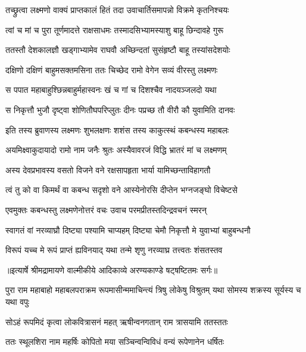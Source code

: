 \twolineshloka
{तच्छ्रुत्वा लक्ष्मणो वाक्यं प्राप्तकालं हितं तदा}
{उवाचार्तिसमापन्नो विक्रमे कृतनिश्चयः} %

\twolineshloka
{त्वां च मां च पुरा तूर्णमादत्ते राक्षसाधमः}
{तस्मादसिभ्यामस्याशु बाहू छिन्दावहे गुरू} %

\twolineshloka
{ततस्तौ देशकालज्ञौ खड्गाभ्यामेव राघवौ}
{अच्छिन्दतां सुसंहृष्टौ बाहू तस्यांसदेशयोः} %

\twolineshloka
{दक्षिणो दक्षिणं बाहुमसक्तमसिना ततः}
{चिच्छेद रामो वेगेन सव्यं वीरस्तु लक्ष्मणः} %

\twolineshloka
{स पपात महाबाहुश्छिन्नबाहुर्महास्वनः}
{खं च गां च दिशश्चैव नादयञ्जलदो यथा} %

\twolineshloka
{स निकृत्तौ भुजौ दृष्ट्वा शोणितौघपरिप्लुतः}
{दीनः पप्रच्छ तौ वीरौ कौ युवामिति दानवः} %

\twolineshloka
{इति तस्य ब्रुवाणस्य लक्ष्मणः शुभलक्षणः}
{शशंस तस्य काकुत्स्थं कबन्धस्य महाबलः} %

\twolineshloka
{अयमिक्ष्वाकुदायादो रामो नाम जनैः श्रुतः}
{अस्यैवावरजं विद्धि भ्रातरं मां च लक्ष्मणम्} %

\twolineshloka
{अस्य देवप्रभावस्य वसतो विजने वने}
{रक्षसापहृता भार्या यामिच्छन्ताविहागतौ} %

\twolineshloka
{त्वं तु को वा किमर्थं वा कबन्ध सदृशो वने}
{आस्येनोरसि दीप्तेन भग्नजङ्घो विचेष्टसे} %

\twolineshloka
{एवमुक्तः कबन्धस्तु लक्ष्मणेनोत्तरं वचः}
{उवाच परमप्रीतस्तदिन्द्रवचनं स्मरन्} %

\twolineshloka
{स्वागतं वां नरव्याघ्रौ दिष्ट्या पश्यामि चाप्यहम्}
{दिष्ट्या चेमौ निकृत्तौ मे युवाभ्यां बाहुबन्धनौ} %

\twolineshloka
{विरूपं यच्च मे रूपं प्राप्तं ह्यविनयाद् यथा}
{तन्मे शृणु नरव्याघ्र तत्त्वतः शंसतस्तव} %


{॥इत्यार्षे श्रीमद्रामायणे वाल्मीकीये आदिकाव्ये अरण्यकाण्डे षट्षष्टितमः सर्गः॥}


\threelineshloka
{पुरा राम महाबाहो महाबलपराक्रम}
{रूपमासीन्ममाचिन्त्यं त्रिषु लोकेषु विश्रुतम्}
{यथा सोमस्य शक्रस्य सूर्यस्य च यथा वपुः} %

\twolineshloka
{सोऽहं रूपमिदं कृत्वा लोकवित्रासनं महत्}
{ऋषीन्वनगतान् राम त्रासयामि ततस्ततः} %

\twolineshloka
{ततः स्थूलशिरा नाम महर्षिः कोपितो मया}
{सञ्चिन्वन्विविधं वन्यं रूपेणानेन धर्षितः} %

